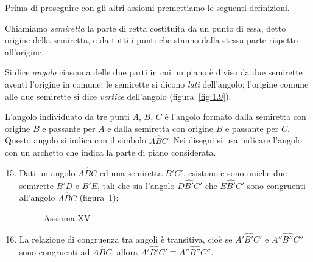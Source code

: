 Prima di proseguire con gli altri assiomi premettiamo le seguenti definizioni.
\begin{definizione}
Chiamiamo \emph{semiretta} la parte di retta costituita da un punto di essa, detto origine della semiretta, e da tutti i punti che stanno dalla stessa parte rispetto all'origine.
\end{definizione}

\begin{center}
 
\end{center}

\begin{definizione}
Si dice \emph{angolo} ciascuna delle due parti in cui un piano è diviso da due semirette aventi l'origine in comune; le semirette si dicono \emph{lati} dell'angolo; l'origine comune alle due semirette si dice \emph{vertice} dell'angolo (figura~\ref{fig:1.9}).
\end{definizione}
\begin{figure*}[b,t,h]
\centering  
\caption{Le semirette $r$ e $s$, aventi l'origine $V$ comune, individuano due regioni del piano ognuna delle quali è detta \emph{angolo}.}\label{fig:1.9}
\end{figure*}

L'angolo individuato da tre punti $A$, $B$, $C$ è l'angolo formato dalla semiretta con origine $B$ e passante per $A$ e dalla semiretta con origine $B$ e passante per $C$. Questo angolo si indica con il simbolo $A\widehat{B}C$. Nei disegni si usa indicare l'angolo con un archetto che indica la parte di piano considerata.

\begin{enumerate}[label=\Roman{*}.]
\setcounter{enumi}{14}
\item Dati un angolo $A\widehat{B}C$ ed una semiretta $B'C'$, esistono e sono uniche due semirette $B'D$ e $B'E$, tali che sia l'angolo $D\widehat{B'}C'$ che $E\widehat{B'}C'$ sono congruenti all'angolo $A\widehat{B}C$ (figura~\ref{fig:1.10});
\begin{figure}[b,t,h]
 \centering 
 \caption{Assioma XV}\label{fig:1.10}
\end{figure}
\item La relazione di congruenza tra angoli è transitiva, cioè se  $A'\widehat{B'}C'$ e  $A''\widehat{B''}C''$ sono congruenti ad $A\widehat{B}C$, allora  $A'\widehat{B'}C' \equiv A''\widehat{B''}C''$.
\end{enumerate}

